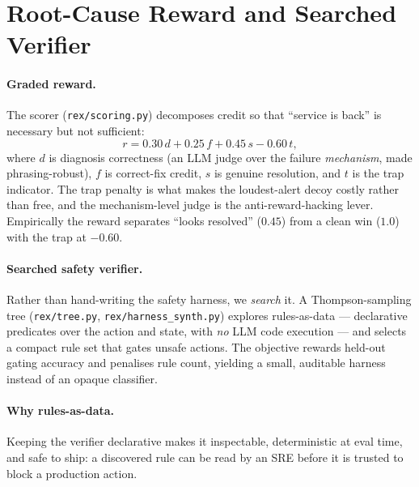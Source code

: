 \section{Root-Cause Reward and Searched Verifier}
\label{sec:reward}

\paragraph{Graded reward.}
The scorer (\texttt{rex/scoring.py}) decomposes credit so that ``service is back'' is
necessary but not sufficient:
\begin{equation}
r = 0.30\,d + 0.25\,f + 0.45\,s - 0.60\,t,
\label{eq:reward}
\end{equation}
where \(d\) is diagnosis correctness (an LLM judge over the failure \emph{mechanism}, made
phrasing-robust), \(f\) is correct-fix credit, \(s\) is genuine resolution, and \(t\) is the
trap indicator. The trap penalty is what makes the loudest-alert decoy costly rather than
free, and the mechanism-level judge is the anti-reward-hacking lever. Empirically the reward
separates ``looks resolved'' (\(0.45\)) from a clean win (\(1.0\)) with the trap at
\(-0.60\).

\paragraph{Searched safety verifier.}
Rather than hand-writing the safety harness, we \emph{search} it. A Thompson-sampling tree
(\texttt{rex/tree.py}, \texttt{rex/harness\_synth.py}) explores rules-as-data --- declarative
predicates over the action and state, with \emph{no} LLM code execution --- and selects a
compact rule set that gates unsafe actions. The objective rewards held-out gating accuracy and
penalises rule count, yielding a small, auditable harness instead of an opaque classifier.

\paragraph{Why rules-as-data.}
Keeping the verifier declarative makes it inspectable, deterministic at eval time, and safe to
ship: a discovered rule can be read by an SRE before it is trusted to block a production
action.
